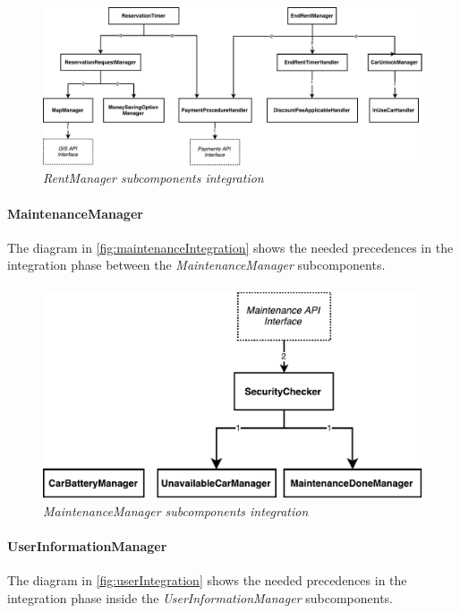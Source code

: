 \paragraph{}

		\begin{figure}[h]
			\centering
			\includegraphics[width=\linewidth]{img/rentManagerIntegration}
			\caption{
				\label{fig:rentManagerIntegration} 
				\emph{RentManager subcomponents integration}
			}
		\end{figure}
		
\paragraph{MaintenanceManager} 
The diagram in \autoref{fig:maintenanceIntegration} shows the needed precedences in the integration phase between the \emph{MaintenanceManager} subcomponents.
\paragraph{}

		\begin{figure}[h]
			\centering
			\includegraphics[width=0.6\linewidth]{img/maintenanceIntegration}
			\caption{
				\label{fig:maintenanceIntegration} 
				\emph{MaintenanceManager subcomponents integration}
			}
		\end{figure}
		
\paragraph{UserInformationManager} 
The diagram in \autoref{fig:userIntegration} shows the needed precedences in the integration phase inside the \emph{UserInformationManager} subcomponents.
